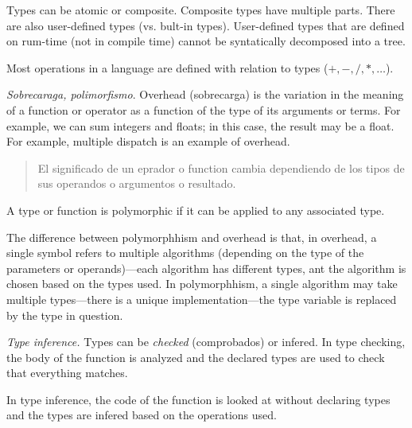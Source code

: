 \documentclass[a4paper, 12pt]{article}
\begin{document}
Types can be atomic or composite. Composite types have multiple parts. There
are also user-defined types (vs. bult-in types). User-defined types that are
defined on rum-time (not in compile time) cannot be syntatically decomposed
into a tree.

Most operations in a language are defined with relation to types ($+, -, /, *,
\ldots$).

\textit{Sobrecaraga, polimorfismo}. Overhead (sobrecarga) is the variation in 
the meaning of a function or operator as a function of the type of its 
arguments or terms. For example, we can sum integers and floats; in 
this case, the result may be a float.  For example, multiple dispatch 
is an example of overhead.


\small
\begin{quote}

El significado de un eprador o function cambia dependiendo de los tipos 
de sus operandos o argumentos o resultado.

\end{quote}
\normalsize

A type or function is polymorphic if it can be applied to any associated type.

The difference between polymorphhism and overhead is that, in overhead, a
single symbol refers to multiple algorithms (depending on the type of the
parameters or operands)---each algorithm has different types, ant the algorithm
is chosen based on the types used. In polymorphhism, a single algorithm may
take multiple types---there is a unique implementation---the type variable is
replaced by the type in question.


\textit{Type inference.} Types can be \textit{checked} (comprobados) or
infered. In type checking, the body of the function is analyzed and the
declared types are used to check that everything matches. 

In type inference, the code of the function is looked at without declaring
types and the types are infered based on the operations used.
\end{document}
